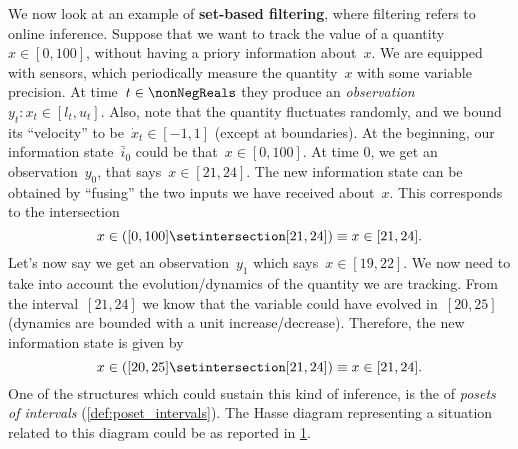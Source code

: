 \begin{example}
    We now look at an example of \textbf{set-based filtering}, where filtering refers to online inference.
    Suppose that we want to track the value of a quantity~$x\in [0,100]$, without having a priory information about~$x$.
    We are equipped with sensors, which periodically measure the quantity~$x$ with some variable precision.
    At time~$t\in \nonNegReals $ they produce an \emph{observation}~$y_t\colon x_t\in [l_t,u_t]$.
    Also, note that the quantity fluctuates randomly, and we bound its ``velocity'' to be~$\dot{x}_t\in [-1,1]$ (except at boundaries).
    At the beginning, our information state~$\bar{i}_0$ could be that~$x\in [0,100]$.
    At time 0, we get an observation~$y_0$, that says~$x\in [21,24]$.
    The new information state can be obtained by ``fusing'' the two inputs we have received about~$x$.
    This corresponds to the intersection
    \begin{equation*}
        x\in \left( [0,100] \setintersection [21,24]\right)\equiv x\in [21,24].
    \end{equation*}
    Let's now say we get an observation~$y_1$ which says~$x\in [19,22]$.
    We now need to take into account the evolution/dynamics of the quantity we are tracking.
    From the interval~$[21,24]$ we know that the variable could have evolved in~$[20,25]$ (dynamics are bounded with a unit increase/decrease).
    Therefore, the new information state is given by
    \begin{equation*}
        x\in \left( [20,25] \setintersection [21,24]\right)\equiv x\in [21,24].
    \end{equation*}
    One of the structures which could sustain this kind of inference, is the of \emph{posets of intervals} (\cref{def:poset_intervals}).
    The Hasse diagram representing a situation related to this diagram could be as reported in \cref{fig:hasse_filtering}.
    \begin{figure}[h!]
        \centering
        \caption{}
        \label{fig:hasse_filtering}
    \end{figure}
\end{example}

